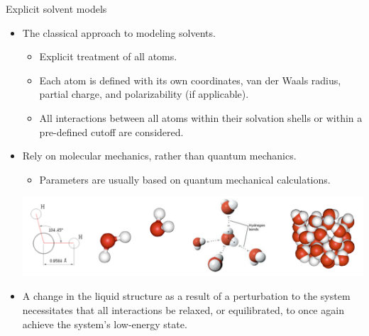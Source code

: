 \documentclass[10pt]{beamer}
\begin{document}

\begin{frame}[t]{Explicit solvent models}

\begin{itemize}
    \item The classical approach to modeling solvents.
    \begin{itemize}
    \item Explicit treatment of all atoms.
    \item Each atom is defined with its own coordinates, van der Waals radius, partial charge, and polarizability (if applicable).
    \item All interactions between all atoms within their solvation shells or within a pre-defined cutoff are considered.
    \end{itemize}
    \item Rely on molecular mechanics, rather than quantum mechanics.
    \begin{itemize}
    \item Parameters are usually based on quantum mechanical calculations.
    \end{itemize}
    \begin{center}
    \includegraphics[scale=0.2]{figures/waters.png}
    \end{center}
    \item A change in the liquid structure as a result of a perturbation to the system necessitates that all interactions be relaxed, or equilibrated, to once again achieve the system's low-energy state.
\end{itemize}
\end{frame}

\end{document}
